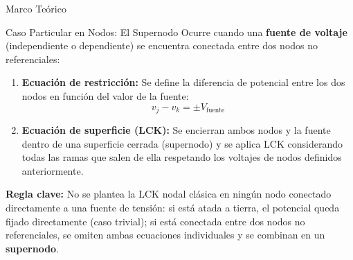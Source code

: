 \documentclass[10pt, aspectratio=169]{beamer}
\begin{document}
\begin{frame}{Marco Teórico}
    \begin{boxTeoria}{Caso Particular en Nodos: El Supernodo}
        Ocurre cuando una \textbf{fuente de voltaje} (independiente o dependiente) se encuentra conectada entre dos nodos no referenciales:
        \begin{enumerate}
            \item \textbf{Ecuación de restricción:} Se define la diferencia de potencial entre los dos nodos en función del valor de la fuente:
                  \begin{equation*}
                      v_j - v_k = \pm V_{\text{fuente}}
                  \end{equation*}
            \item \textbf{Ecuación de superficie (LCK):} Se encierran ambos nodos y la fuente dentro de una superficie cerrada (supernodo) y se aplica LCK considerando todas las ramas que salen de ella respetando los voltajes de nodos definidos anteriormente.
        \end{enumerate}

        \vspace{0.1cm}
        \textbf{Regla clave:} No se plantea la LCK nodal clásica en ningún nodo conectado directamente a una fuente de tensión: si está atada a tierra, el potencial queda fijado directamente (caso trivial); si está conectada entre dos nodos no referenciales, se omiten ambas ecuaciones individuales y se combinan en un \textbf{supernodo}.
    \end{boxTeoria}
\end{frame}
\end{document}
